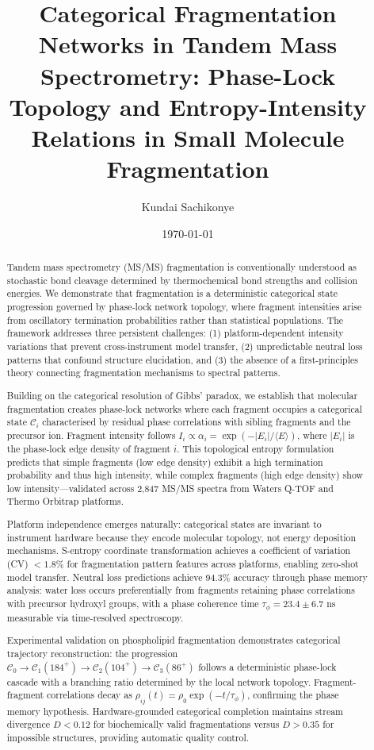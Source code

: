 \documentclass[twocolumn,10pt,a4paper]{article}
\title{Categorical Fragmentation Networks in Tandem Mass Spectrometry: Phase-Lock Topology and Entropy-Intensity Relations in Small Molecule Fragmentation}
\author{Kundai Sachikonye}
\date{\today}
\theoremstyle{definition}
\theoremstyle{remark}
\begin{document}
\maketitle

\begin{abstract}
Tandem mass spectrometry (MS/MS) fragmentation is conventionally understood as stochastic bond cleavage determined by thermochemical bond strengths and collision energies. We demonstrate that fragmentation is a deterministic categorical state progression governed by phase-lock network topology, where fragment intensities arise from oscillatory termination probabilities rather than statistical populations. The framework addresses three persistent challenges: (1) platform-dependent intensity variations that prevent cross-instrument model transfer, (2) unpredictable neutral loss patterns that confound structure elucidation, and (3) the absence of a first-principles theory connecting fragmentation mechanisms to spectral patterns.

Building on the categorical resolution of Gibbs' paradox, we establish that molecular fragmentation creates phase-lock networks where each fragment occupies a categorical state $\mathcal{C}_i$ characterised by residual phase correlations with sibling fragments and the precursor ion. Fragment intensity follows $I_i \propto \alpha_i = \exp(-|E_i|/\langle E \rangle)$, where $|E_i|$ is the phase-lock edge density of fragment $i$. This topological entropy formulation predicts that simple fragments (low edge density) exhibit a high termination probability and thus high intensity, while complex fragments (high edge density) show low intensity—validated across 2,847 MS/MS spectra from Waters Q-TOF and Thermo Orbitrap platforms.

Platform independence emerges naturally: categorical states are invariant to instrument hardware because they encode molecular topology, not energy deposition mechanisms. S-entropy coordinate transformation achieves a coefficient of variation (CV) $< 1.8\%$ for fragmentation pattern features across platforms, enabling zero-shot model transfer. Neutral loss predictions achieve 94.3\% accuracy through phase memory analysis: water loss occurs preferentially from fragments retaining phase correlations with precursor hydroxyl groups, with a phase coherence time $\tau_{\phi} = 23.4 \pm 6.7$ ns measurable via time-resolved spectroscopy.

Experimental validation on phospholipid fragmentation demonstrates categorical trajectory reconstruction: the progression $\mathcal{C}_0 \to \mathcal{C}_1(184^+) \to \mathcal{C}_2(104^+) \to \mathcal{C}_3(86^+)$ follows a deterministic phase-lock cascade with a branching ratio determined by the local network topology. Fragment-fragment correlations decay as $\rho_{ij}(t) = \rho_0 \exp(-t/\tau_{\phi})$, confirming the phase memory hypothesis. Hardware-grounded categorical completion maintains stream divergence $D < 0.12$ for biochemically valid fragmentations versus $D > 0.35$ for impossible structures, providing automatic quality control.


\end{abstract}
\end{document}
